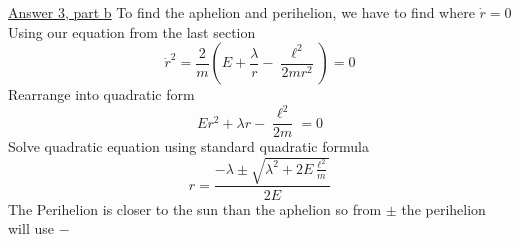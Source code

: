 \documentclass[12pt]{article}
\begin{document}
    \underline{Answer 3, part b}
    To find the aphelion and perihelion, we have to find where $\dot{r} = 0$
    \newline Using our equation from the last section
    \[
        \dot{r} ^2 = \frac{2}{m} \left(E + \frac{\lambda}{r} - \frac{\ell^2}{2 m r^2} \right) = 0
    \]
    Rearrange into quadratic form
    \[
        E r^2 + \lambda r - \frac{\ell^2}{2 m} = 0
    \]
    Solve quadratic equation using standard quadratic formula 
    \[
        r = \frac{- \lambda \pm \sqrt{\lambda^2 + 2 E \frac{\ell^2}{m}}}{2 E}
    \]
    The Perihelion is closer to the sun than the aphelion so from $\pm$ the perihelion will use $-$
    
    
\newpage
\end{document}
